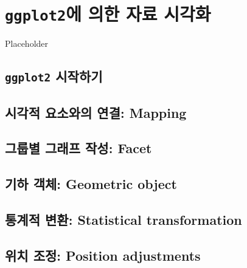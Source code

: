 \documentclass[
]{book}
\begin{document}
\hypertarget{chapter-ggplot2}{%
\chapter{\texorpdfstring{\texttt{ggplot2}에 의한 자료 시각화}{ggplot2에 의한 자료 시각화}}\label{chapter-ggplot2}}

Placeholder

\hypertarget{ggplot2-uxc2dcuxc791uxd558uxae30}{%
\section{\texorpdfstring{\texttt{ggplot2} 시작하기}{ggplot2 시작하기}}\label{ggplot2-uxc2dcuxc791uxd558uxae30}}

\hypertarget{uxc2dcuxac01uxc801-uxc694uxc18cuxc640uxc758-uxc5f0uxacb0-mapping}{%
\section{시각적 요소와의 연결: Mapping}\label{uxc2dcuxac01uxc801-uxc694uxc18cuxc640uxc758-uxc5f0uxacb0-mapping}}

\hypertarget{uxadf8uxb8f9uxbcc4-uxadf8uxb798uxd504-uxc791uxc131-facet}{%
\section{그룹별 그래프 작성: Facet}\label{uxadf8uxb8f9uxbcc4-uxadf8uxb798uxd504-uxc791uxc131-facet}}

\hypertarget{uxae30uxd558-uxac1duxccb4-geometric-object}{%
\section{기하 객체: Geometric object}\label{uxae30uxd558-uxac1duxccb4-geometric-object}}

\hypertarget{uxd1b5uxacc4uxc801-uxbcc0uxd658-statistical-transformation}{%
\section{통계적 변환: Statistical transformation}\label{uxd1b5uxacc4uxc801-uxbcc0uxd658-statistical-transformation}}

\hypertarget{uxc704uxce58-uxc870uxc815-position-adjustments}{%
\section{위치 조정: Position adjustments}\label{uxc704uxce58-uxc870uxc815-position-adjustments}}
\end{document}
